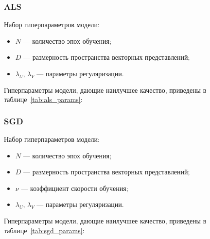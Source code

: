 \subsubsection{ALS}
Набор гиперпараметров модели:
\begin{itemize}
    \item $N$ --- количество эпох обучения;
    \item $D$ --- размерность пространства векторных представлений;
    \item $\lambda_{U}$, $\lambda_{V}$ --- параметры регуляризации.
\end{itemize}

Гиперпараметры модели, дающие наилучшее качество, приведены в таблице~\ref{tab:als_params}:
\begin{table}[h]
    \caption{Гиперпараметры ALS}
    \label{tab:als_params}
\end{table}

\pagebreak
\subsubsection{SGD}
Набор гиперпараметров модели:
\begin{itemize}
    \item $N$ --- количество эпох обучения;
    \item $D$ --- размерность пространства векторных представлений;
    \item $\nu$ --- коэффициент скорости обучения;
    \item $\lambda_{U}$, $\lambda_{V}$ --- параметры регуляризации.
\end{itemize}

Гиперпараметры модели, дающие наилучшее качество, приведены в таблице~\ref{tab:sgd_params}:
\begin{table}[h]
    \caption{Гиперпараметры SGD}
    \label{tab:sgd_params}
\end{table}


